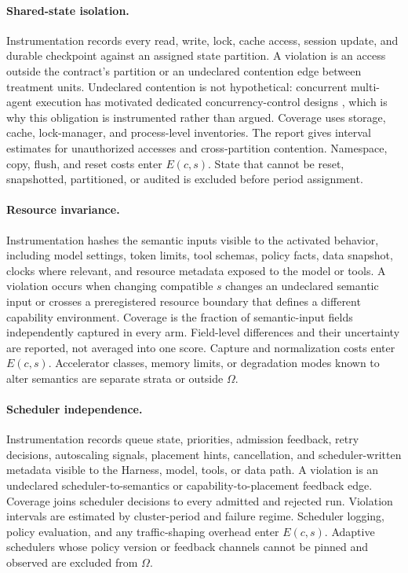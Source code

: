 \paragraph{Shared-state isolation.}
Instrumentation records every read, write, lock, cache access, session update, and durable checkpoint against an assigned state partition. A violation is an access outside the contract's partition or an undeclared contention edge between treatment units. Undeclared contention is not hypothetical: concurrent multi-agent execution has motivated dedicated concurrency-control designs \cite{lyu2026coagent}, which is why this obligation is instrumented rather than argued. Coverage uses storage, cache, lock-manager, and process-level inventories. The report gives interval estimates for unauthorized accesses and cross-partition contention. Namespace, copy, flush, and reset costs enter $E(c,s)$. State that cannot be reset, snapshotted, partitioned, or audited is excluded before period assignment.

\paragraph{Resource invariance.}
Instrumentation hashes the semantic inputs visible to the activated behavior, including model settings, token limits, tool schemas, policy facts, data snapshot, clocks where relevant, and resource metadata exposed to the model or tools. A violation occurs when changing compatible $s$ changes an undeclared semantic input or crosses a preregistered resource boundary that defines a different capability environment. Coverage is the fraction of semantic-input fields independently captured in every arm. Field-level differences and their uncertainty are reported, not averaged into one score. Capture and normalization costs enter $E(c,s)$. Accelerator classes, memory limits, or degradation modes known to alter semantics are separate strata or outside $\Omega$.

\paragraph{Scheduler independence.}
Instrumentation records queue state, priorities, admission feedback, retry decisions, autoscaling signals, placement hints, cancellation, and scheduler-written metadata visible to the Harness, model, tools, or data path. A violation is an undeclared scheduler-to-semantics or capability-to-placement feedback edge. Coverage joins scheduler decisions to every admitted and rejected run. Violation intervals are estimated by cluster-period and failure regime. Scheduler logging, policy evaluation, and any traffic-shaping overhead enter $E(c,s)$. Adaptive schedulers whose policy version or feedback channels cannot be pinned and observed are excluded from $\Omega$.

